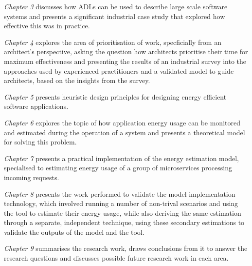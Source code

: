 \emph{Chapter 3} discusses how ADLs can be used to describe large scale software systems and presents a significant industrial case study that explored how effective this was in practice.

\emph{Chapter 4} explores the area of prioritisation of work, specficially from an architect's perspective, asking the question how architects prioritise their time for maximum effectiveness and presenting the results of an industrial survey into the approaches used by experienced practitioners and a validated model to guide architects, based on the insights from the survey.

\emph{Chapter 5} presents heuristic design principles for designing energy efficient software applications.

\emph{Chapter 6} explores the topic of how application energy usage can be monitored and estimated during the operation of a system and presents a theoretical model for solving this problem.

\emph {Chapter 7} presents a practical implementation of the energy estimation model, specialised to estimating energy usage of a group of microservices processing incoming requests.

\emph{Chapter 8} presents the work performed to validate the model implementation technology, which involved running a number of non-trival scenarios and using the tool to estimate their energy usage, while also deriving the same estimation through a separate, independent technique, using these secondary estimations to validate the outputs of the model and the tool.

\emph {Chapter 9} summarises the research work, draws conclusions from it to answer the research questions and discusses possible future research work in each area.



